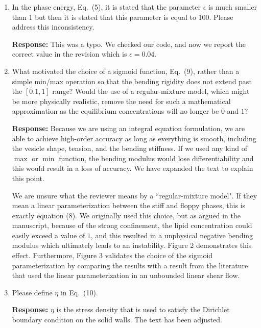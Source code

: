 \documentclass[11pt]{article}
\begin{document}
\begin{enumerate}
\item In the phase energy, Eq.~(5), it is stated that the parameter
  $\epsilon$ is much smaller than 1 but then it is stated that this
    parameter is equal to 100. Please address this inconsistency.

\noindent
{\bf Response:} This was a typo. We checked our code, and now we
report the correct value in the revision which is $\epsilon = 0.04$.

\item What motivated the choice of a sigmoid function, Eq.~(9), rather
  than a simple min/max operation so that the bending rigidity does not
    extend past the $[0.1, 1]$ range? Would the use of a regular-mixture
    model, which might be more physically realistic, remove the need for
    such a mathematical approximation as the equilibrium concentrations
    will no longer be $0$ and $1$?

\noindent
{\bf Response:} Because we are using an integral equation formulation,
    we are able to achieve high-order accuracy as long as everything is
    smooth, including the vesicle shape, tension, and the bending
    stiffness. If we used any kind of $\max$ or $\min$ function, the
    bending modulus would lose differentiability and this would result
    in a loss of accuracy. We have expanded the text to explain this
    point.

    We are unsure what the reviewer means by a ``regular-mixture model".
    If they mean a linear parameterization between the stiff and floppy
    phases, this is exactly equation (8).  We originally used this
    choice, but as argued in the manuscript, because of the strong
    confinement, the lipid concentration could easily exceed a value of
    $1$, and this resulted in a unphysical negative bending modulus
    which ultimately leads to an instability.  Figure 2 demonstrates
    this effect. Furthermore, Figure 3 validates the choice of the
    sigmoid parameterization by comparing the results with a result from
    the literature that used the linear parameterization in an unbounded
    linear shear flow.

\item Please define $\eta$ in Eq.~(10). 

\noindent
{\bf Response:} $\eta$ is the stress density that is used to satisfy the
    Dirichlet boundary condition on the solid walls. The text has been
    adjusted.


\end{enumerate}
\end{document}
